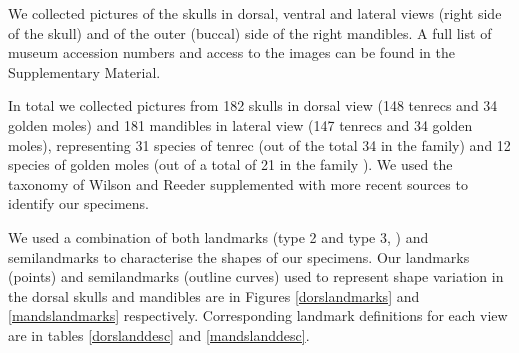 \documentclass[12pt,a4paper]{article}
\begin{document}

We collected pictures of the skulls in dorsal, ventral and lateral views (right side of the skull) and of the outer (buccal) side of the right mandibles. A full list of museum accession numbers and access to the images can be found in the Supplementary Material.


In total we collected pictures from 182 skulls in dorsal view (148 tenrecs and 34 golden moles) and 181 mandibles in lateral view (147 tenrecs and 34 golden moles), representing 31 species of tenrec (out of the total 34 in the family) and 12 species of golden moles (out of a total of 21 in the family \citep{Asher2010}). We used the taxonomy of Wilson and Reeder \citeyearpar{Wilson2005} supplemented with more recent sources \citep{IUCN2012, Olson2013} to identify our specimens. 
	

We used a combination of both landmarks (type 2 and type 3, \citep{Zelditch2012}) and semilandmarks to characterise the shapes of our specimens. Our landmarks (points) and semilandmarks (outline curves) used to represent shape variation in the dorsal skulls and mandibles are in Figures \ref{dorslandmarks} and \ref{mandslandmarks} respectively. Corresponding landmark definitions for each view are in tables \ref{dorslanddesc} and \ref{mandslanddesc}.


	
\end{document}
